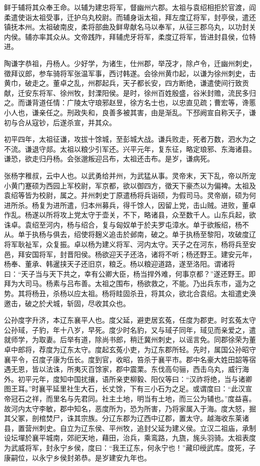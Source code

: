\documentclass[12pt,UTF8]{ctexbook}
\begin{document}
鲜于辅将其众奉王命。以辅为建忠将军，督幽州六郡。太祖与袁绍相拒於官渡，阎柔遣使诣太祖受事，迁护乌丸校尉。而辅身诣太祖，拜左度辽将军，封亭侯，遣还镇抚本州。太祖破南皮，柔将部曲及鲜卑献名马以奉军，从征三郡乌丸，以功封关内侯。辅亦率其众从。文帝践阼，拜辅虎牙将军，柔度辽将军，皆进封县侯，位特进。

陶谦字恭祖，丹杨人。少好学，为诸生，仕州郡，举茂才，除卢令，迁幽州刺史，徵拜议郎，参车骑将军张温军事，西讨韩遂。会徐州黄巾起，以谦为徐州刺史，击黄巾，破走之。董卓之乱，州郡起兵，天子都长安，四方断绝，谦遣使间行致贡献，迁安东将军、徐州牧，封溧阳侯。是时，徐州百姓殷盛，谷米封赡，流民多归之。而谦背道任情：广陵太守琅邪赵昱，徐方名士也，以忠直见疏；曹宏等，谗慝小人也，谦亲任之。刑政失和，良善多被其害，由是渐乱。下邳阙宣自称天子，谦初与合从寇钞，后遂杀宣，并其众。

初平四年，太祖征谦，攻拔十馀城，至彭城大战。谦兵败走，死者万数，泗水为之不流。谦退守郯。太祖以粮少引军还。兴平元年，复东征，略定琅邪、东海诸县。谦恐，欲走归丹杨。会张邈叛迎吕布，太祖还击布。是岁，谦病死。

张杨字稚叔，云中人也。以武勇给并州，为武猛从事。灵帝末，天下乱，帝以所宠小黄门蹇硕为西园上军校尉，军京都，欲以御四方，徵天下豪杰以为偏裨。太祖及袁绍等皆为校尉，属之。并州刺史丁原遣杨将兵诣硕，为假司马。灵帝崩，硕为何进所杀。杨复为进所遣，归本州募兵，得千馀人，因留上党，击山贼。进败，董卓作乱。杨遂以所将攻上党太守于壶关，不下，略诸县，众至数千人。山东兵起，欲诛卓。袁绍至河内，杨与绍合，复与匈奴单于於夫罗屯漳水。单于欲叛绍，杨不从。单于执杨与俱去，绍使将麹义追击於邺南，破之。单于执杨至黎阳，攻破度辽将军耿祉军，众复振。卓以杨为建义将军、河内太守。天子之在河东，杨将兵至安邑，拜安国将军，封晋阳侯。杨欲迎天子还洛，诸将不听；杨还野王。建安元年，杨奉、董承、韩暹挟天子还旧京，粮乏。杨以粮迎道路，遂至洛阳。谓诸将曰：“天子当与天下共之，幸有公卿大臣，杨当捍外难，何事京都？”遂还野王。即拜为大司马。杨素与吕布善。太祖之围布，杨欲救之，不能。乃出兵东市，遥为之势。其将杨丑，杀杨以应太祖。杨将眭固杀丑，将其众，欲北合袁绍。太祖遣史涣邀击，破之於犬城，斩固，尽收其众也。

公孙度字升济，本辽东襄平人也。度父延，避吏居玄菟，任度为郡吏。时玄菟太守公孙琙，子豹，年十八岁，早死。度少时名豹，又与琙子同年，琙见而亲爱之，遣就师学，为取妻。后举有道，除尚书郎，稍迁冀州刺史，以谣言免。同郡徐荣为董卓中郎将，荐度为辽东太守。度起玄菟小吏，为辽东郡所轻。先时，属国公孙昭守襄平令，召度子康为伍长。度到官，收昭，笞杀于襄平市。郡中名豪大姓田韶等宿遇无恩，皆以法诛，所夷灭百馀家，郡中震栗。东伐高句骊，西击乌丸，威行海外。初平元年，度知中国扰攘，语所亲吏柳毅、阳仪等曰：“汉祚将绝，当与诸卿图王耳。”时襄平延里社生大石，长丈馀，下有三小石为之足。或谓度曰：“此汉宣帝冠石之祥，而里名与先君同。社主土地，明当有土地，而三公为辅也。”度益喜。故河内太守李敏，郡中知名，恶度所为，恐为所害，乃将家属入于海。度大怒，掘其父冢，剖棺焚尸，诛其宗族。分辽东郡为辽西中辽郡，置太守。越海收东莱诸县，置营州刺史。自立为辽东侯、平州牧，追封父延为建义侯。立汉二祖庙，承制设坛墠於襄平城南，郊祀天地，藉田，治兵，乘鸾路，九旒，旄头羽骑。太祖表度为武威将军，封永宁乡侯，度曰：“我王辽东，何永宁也！”藏印绶武库。度死，子康嗣位，以永宁乡侯封弟恭。是岁建安九年也。
\end{document}
